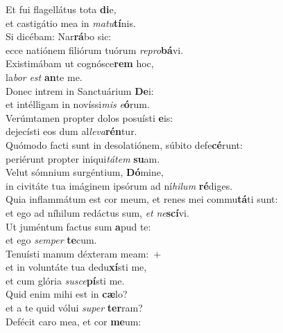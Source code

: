 \evenverse Et fui flagellátus tota \textbf{di}e,~\*\\
\evenverse et castigátio mea in \textit{ma}\textit{tu}\textbf{tí}nis.\\
\oddverse Si dicébam: Nar\textbf{rá}bo sic:~\*\\
\oddverse ecce natiónem filiórum tuórum \textit{re}\textit{pro}\textbf{bá}vi.\\
\evenverse Existimábam ut cognósce\textbf{rem} hoc,~\*\\
\evenverse la\textit{bor} \textit{est} \textbf{an}te me.\\
\oddverse Donec intrem in Sanctuárium \textbf{De}i:~\*\\
\oddverse et intélligam in novíssi\textit{mis} \textit{e}\textbf{ó}rum.\\
\evenverse Verúmtamen propter dolos posuísti \textbf{e}is:~\*\\
\evenverse dejecísti eos dum al\textit{le}\textit{va}\textbf{rén}tur.\\
\oddverse Quómodo facti sunt in desolatiónem, súbito defe\textbf{cé}runt:~\*\\
\oddverse periérunt propter iniqui\textit{tá}\textit{tem} \textbf{su}am.\\
\evenverse Velut sómnium surgéntium, \textbf{Dó}mine,~\*\\
\evenverse in civitáte tua imáginem ipsórum ad ní\textit{hi}\textit{lum} \textbf{ré}diges.\\
\oddverse Quia inflammátum est cor meum, et renes mei commu\textbf{tá}ti sunt:~\*\\
\oddverse et ego ad níhilum redáctus sum, \textit{et} \textit{ne}\textbf{scí}vi.\\
\evenverse Ut juméntum factus sum \textbf{a}pud te:~\*\\
\evenverse et ego \textit{sem}\textit{per} \textbf{te}cum.\\
\oddverse Tenuísti manum déxteram meam:~+\\
\oddverse  et in voluntáte tua dedu\textbf{xí}sti me,~\*\\
\oddverse et cum glória \textit{su}\textit{sce}\textbf{pí}sti me.\\
\evenverse Quid enim mihi est in \textbf{cæ}lo?~\*\\
\evenverse et a te quid vólui \textit{su}\textit{per} \textbf{ter}ram?\\
\oddverse Defécit caro mea, et cor \textbf{me}um:~\*\\
